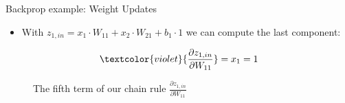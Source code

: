 \begin{vbframe}{Backprop example: Weight Updates}
  \begin{itemize}
    \item With $z_{1,in} = x_1 \cdot W_{11} + x_2 \cdot W_{21} + b_1 \cdot 1$ we can compute the last component:
  \end{itemize}
  \begin{eqnarray*}
    \textcolor{violet}{\frac{\partial z_{1,in}}{\partial W_{11}}} = x_1 = 1
  \end{eqnarray*}
  \begin{figure}
    \centering
      \caption{The fifth term of our chain rule $\frac{\partial z_{1,in}}{\partial W_{11}}$}
  \end{figure}
\framebreak


\end{vbframe}

